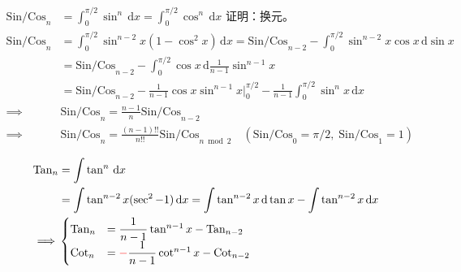 \documentclass[12pt, a4paper, UTF8, openany]{ctexbook}
\newcommand{\dif}{\mathrm{d}}
\newcommand{\difx}{\,\mathrm{d}x}
\begin{document}
        $$\begin{aligned}
            \text{Sin/Cos}_n &= \int_{0}^{\pi / 2} \sin^n\difx = \int_{0}^{\pi / 2} \cos^n\difx \text{ 证明：换元。} \\
            \text{Sin/Cos}_n &= \int_{0}^{\pi / 2} \sin^{n - 2}x (1 - \cos^2 x)\difx 
                = \text{Sin/Cos}_{n - 2} - \int_{0}^{\pi / 2} \sin^{n - 2}x \cos x \,\dif\sin x \\
                &= \text{Sin/Cos}_{n - 2} - \int_{0}^{\pi / 2} \cos x \,\dif \frac{1}{n - 1}\sin^{n - 1} x \\
                &= \text{Sin/Cos}_{n - 2} - \frac{1}{n - 1}\cos x \sin^{n - 1} x |_{0}^{\pi / 2} 
                    - \frac{1}{n - 1}\int_{0}^{\pi / 2} \sin^n x\difx \\
            \implies &\text{Sin/Cos}_n = \frac{n - 1}{n} \text{Sin/Cos}_{n - 2} \\
            \implies &\text{Sin/Cos}_n = \frac{(n - 1)!!}{n!!} \text{Sin/Cos}_{n \bmod 2} 
                \quad (\text{Sin/Cos}_0 = \pi / 2, \; \text{Sin/Cos}_1 = 1)
        \end{aligned}$$

        $$\begin{aligned}
            \text{Tan}_n &= \int \tan^n\difx \\ 
                &= \int \tan^{n - 2}x (\sec^2 - 1)\difx
                = \int \tan^{n - 2}x\,\dif\tan x - \int\tan^{n - 2}x\difx \\
            \implies &
            \begin{cases}
                \text{Tan}_n & = \dfrac{1}{n - 1}\tan^{n - 1}x - \text{Tan}_{n - 2} \\
                \text{Cot}_n & = {\color{red}-}\dfrac{1}{n - 1}\cot^{n - 1}x - \text{Cot}_{n - 2}
            \end{cases}
        \end{aligned}$$
\end{document}
